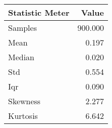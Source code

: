 \begin{tabular}{lr}
\hline
 Statistic Meter   &   Value \\
\hline
 Samples           & 900.000 \\
 Mean              &   0.197 \\
 Median            &   0.020 \\
 Std               &   0.554 \\
 Iqr               &   0.090 \\
 Skewness          &   2.277 \\
 Kurtosis          &   6.642 \\
\hline
\end{tabular}